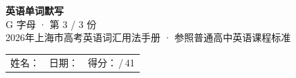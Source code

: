 \documentclass[10pt,a4paper]{article}
\begin{document}
\pagestyle{plain}

\begin{center}
{\LARGE\bfseries 英语单词默写}\\[0.22em]
{\large G 字母 · 第 3 / 3 份}\\[0.18em]
{\small 2026年上海市高考英语词汇用法手册 · 参照普通高中英语课程标准}
\end{center}

\vspace{0.25em}
\noindent\begin{tabular}{@{}p{}@{}p{}@{}p{}@{}}
姓名：\underline{\hspace{2.0cm}} & 日期：\underline{\hspace{2.0cm}} & 得分：\underline{\hspace{1.3cm}}\,/\,41 \\
\end{tabular}

\vspace{0.3em}

\vspace{0.08em}
\end{document}
